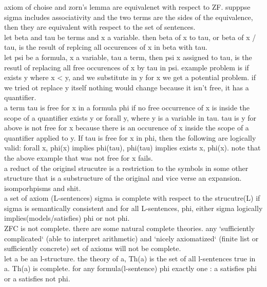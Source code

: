 \documentclass[11pt]{amsart}
\begin{document}
    axiom of choise and zorn's lemma are equivalenet with respect to ZF.
    supppse sigma includes associativity and the two terms are the sides of the equivalence, then they are equivalent with respect to the set of sentences.
    \\
    let beta and tau be terms and x a variable.
    then beta of x to tau, or beta of x / tau, is the result of replcing all occurences of x in beta with tau.
    \\
    let psi be a formula, x a variable, tau a term, then psi x assigned to tau, is the resutl of replacing all free occurences of x by tau in psi.
    example problem is if exists y where x < y, and we substitute in y for x we get a potential problem.
    if we tried ot replace y itself nothing would change because it isn't free, it has a quantifier.
    \\
    a term tau is free for x in a formula phi if no free occurrence of x is inside the scope of a quantifier exists y or forall y, where y is a variable in tau.
    tau is y for above is not free for x because there is an occurence of x inside the scope of a quantifier applied to y.
    If tau is free for x in phi, then the following are logically valid: forall x, phi(x) implies phi(tau), phi(tau) implies exists x, phi(x).
    note that the above example that was not free for x fails.
    \\
    a reduct of the originsl strucutre is a restriction to the symbols in some other structure that is a substructure of the original and vice verse an expansion.
    \\
    isomporhpisms and shit.
    \\
    a set of axiom (L-sentences) sigma is complete with respect to the strucutre(L) if sigma is semantically consistent and for all L-sentences, phi, either sigma logically implies(models/satisfies) phi or not phi.
    \\
    ZFC is not complete.
    there are some natural complete theories.
    any `sufficiently complicated` (able to interpret arithmetic) and `nicely axiomatized` (finite list or sufficiently concrete) set of axioms will not be complete.
    \\
    let a be an l-structure.
    the theory of a, Th(a) is the set of all l-sentences true in a.
    Th(a) is complete.
    for any formula(l-sentence) phi exactly one : a satisfies phi or a satisfies not phi.
    \\
\end{document}
